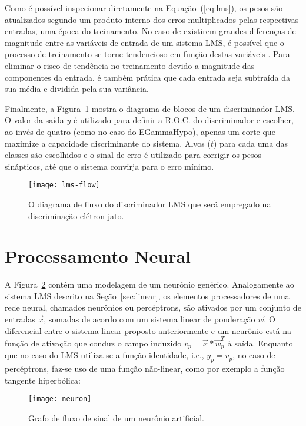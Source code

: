 Como é possível inspecionar diretamente na Equação~(\ref{eq:lms}), os pesos
são atualizados segundo um produto interno dos erros multiplicados pelas
respectivas entradas, uma época do treinamento. No caso de existirem grandes
diferenças de magnitude entre as variáveis de entrada de um sistema LMS, é
possível que o processo de treinamento se torne tendencioso em função destas
variáveis \cite{haykin-adaptative}. Para eliminar o risco de tendência no
treinamento devido a magnitude das componentes da entrada, é também prática
que cada entrada seja subtraída da sua média e dividida pela sua variância.

Finalmente, a Figura~\ref{fig:lms-flow} mostra o diagrama de blocos de um
discriminador LMS. O valor da saída $y$ é utilizado para definir a R.O.C. do
discriminador e escolher, ao invés de quatro (como no caso do EGammaHypo),
apenas um corte que maximize a capacidade discriminante do sistema. Alvos
($t$) para cada uma das classes são escolhidos e o sinal de erro é utilizado
para corrigir os pesos sinápticos, até que o sistema convirja para o erro
mínimo.

\begin{figure}
\begin{center}
\texttt{[image: lms-flow]}
\end{center}
\caption{O diagrama de fluxo do discriminador LMS que será empregado na
discriminação elétron-jato.}
\label{fig:lms-flow}
\end{figure}

\section{Processamento Neural}

A Figura~\ref{fig:neuron} contém uma modelagem de um neurônio
genérico. Analogamente ao sistema LMS descrito na Seção~\ref{sec:linear}, os
elementos processadores de uma rede neural, chamados neurônios ou percéptrons,
são ativados por um conjunto de entradas $\overrightarrow{x}$, somadas de
acordo com um sistema linear de ponderação $\overrightarrow{w}$. O diferencial
entre o sistema linear proposto anteriormente e um neurônio está na função de
ativação que conduz o campo induzido $v_p =
\overrightarrow{x}*\overrightarrow{w}_{p}^{T}$ à saída. Enquanto que
no caso do LMS utiliza-se a função identidade, i.e., $y_p = v_p$, no caso de
percéptrons, faz-se uso de uma função não-linear, como por exemplo a função
tangente hiperbólica:

\begin{figure}
\begin{center}
\texttt{[image: neuron]}
\end{center}
\caption{Grafo de fluxo de sinal de um neurônio artificial.}
\label{fig:neuron}
\end{figure}

